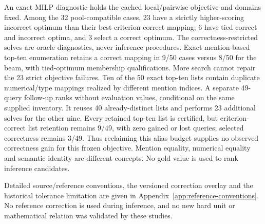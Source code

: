 An exact MILP diagnostic holds the cached local/pairwise objective and
domains fixed. Among the 32 pool-compatible cases, 23 have a strictly
higher-scoring incorrect optimum than their best criterion-correct mapping;
6 have tied correct and incorrect optima, and 3 select a correct optimum.
The correctness-restricted solves are oracle diagnostics, never inference
procedures. Exact mention-based top-ten enumeration retains a correct
mapping in 9/50 cases versus 8/50 for the beam, with tied-optimum membership
qualifications. More search cannot repair the 23 strict objective failures.
Ten of the 50 exact top-ten lists contain duplicate numerical/type mappings
realized by different mention indices. A separate 49-query follow-up ranks without evaluation values, conditional on the same supplied inventory. It reuses
40 already-distinct lists and performs 23 additional solves for the other
nine. Every retained top-ten list is certified, but criterion-correct list
retention remains 9/49, with zero gained or lost queries; selected correctness
remains 3/49. Thus reclaiming this alias budget supplies no observed
correctness gain for this frozen objective. Mention equality, numerical equality and semantic identity are
different concepts. No gold value is used to rank inference candidates.

Detailed source/reference conventions, the versioned correction overlay and the historical tolerance limitation are given in Appendix~\ref{app:reference-conventions}. No reference correction is used during inference, and no new hard unit or mathematical relation was validated by these studies.
